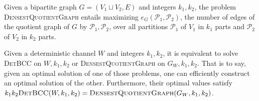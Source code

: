 \begin{defi}
Given a bipartite graph $G  = (V_1 \sqcup V_2, E)$ and integers $k_1,k_2$, the problem \textsc{DensestQuotientGraph} entails maximizing $e_G(\mathcal{P}_1,\mathcal{P}_2)$, the number of edges of the quotient graph of $G$ by $\mathcal{P}_1,\mathcal{P}_2$, over all partitions $\mathcal{P}_1$ of $V_1$ in $k_1$ parts and $\mathcal{P}_2$ of $V_2$ in $k_2$ parts.
\end{defi}

\begin{prop}
  \label{prop:BCCisDQG}
  Given a deterministic channel $W$ and integers $k_1,k_2$, it is equivalent to solve \textsc{DetBCC} on $W,k_1,k_2$ or \textsc{DensestQuotientGraph} on $G_W,k_1,k_2$. That is to say, given an optimal solution of one of those problems, one can efficiently construct an optimal solution of the other. Furthermore, their optimal values satisfy $k_1k_2\textsc{DetBCC}(W,k_1,k_2) = \textsc{DensestQuotientGraph}(G_W,k_1,k_2)$.
\end{prop}
